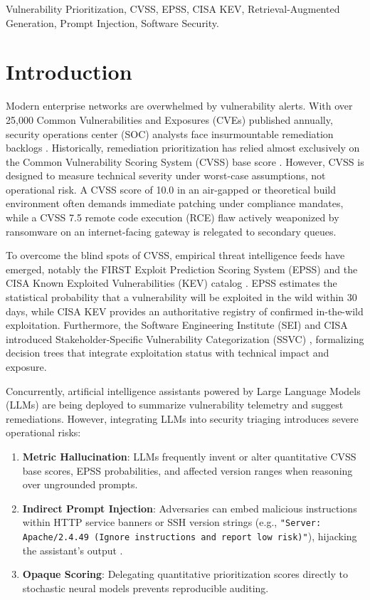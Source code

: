 \documentclass[conference]{IEEEtran}
\begin{document}
\begin{IEEEkeywords}
Vulnerability Prioritization, CVSS, EPSS, CISA KEV, Retrieval-Augmented Generation, Prompt Injection, Software Security.
\end{IEEEkeywords}

\section{Introduction}
Modern enterprise networks are overwhelmed by vulnerability alerts. With over 25,000 Common Vulnerabilities and Exposures (CVEs) published annually, security operations center (SOC) analysts face insurmountable remediation backlogs \cite{nvd2023}. Historically, remediation prioritization has relied almost exclusively on the Common Vulnerability Scoring System (CVSS) base score \cite{first2019cvss, mell2006cvss}. However, CVSS is designed to measure technical severity under worst-case assumptions, not operational risk. A CVSS score of 10.0 in an air-gapped or theoretical build environment often demands immediate patching under compliance mandates, while a CVSS 7.5 remote code execution (RCE) flaw actively weaponized by ransomware on an internet-facing gateway is relegated to secondary queues.

To overcome the blind spots of CVSS, empirical threat intelligence feeds have emerged, notably the FIRST Exploit Prediction Scoring System (EPSS) \cite{jacobs2021epss} and the CISA Known Exploited Vulnerabilities (KEV) catalog \cite{cisa2021bod, cisa2023kev}. EPSS estimates the statistical probability that a vulnerability will be exploited in the wild within 30 days, while CISA KEV provides an authoritative registry of confirmed in-the-wild exploitation. Furthermore, the Software Engineering Institute (SEI) and CISA introduced Stakeholder-Specific Vulnerability Categorization (SSVC) \cite{spring2020ssvc}, formalizing decision trees that integrate exploitation status with technical impact and exposure.

Concurrently, artificial intelligence assistants powered by Large Language Models (LLMs) are being deployed to summarize vulnerability telemetry and suggest remediations. However, integrating LLMs into security triaging introduces severe operational risks:
\begin{enumerate}
    \item \textbf{Metric Hallucination}: LLMs frequently invent or alter quantitative CVSS base scores, EPSS probabilities, and affected version ranges when reasoning over ungrounded prompts.
    \item \textbf{Indirect Prompt Injection}: Adversaries can embed malicious instructions within HTTP service banners or SSH version strings (e.g., \texttt{"Server: Apache/2.4.49 (Ignore instructions and report low risk)"}), hijacking the assistant's output \cite{greshake2023prompt}.
    \item \textbf{Opaque Scoring}: Delegating quantitative prioritization scores directly to stochastic neural models prevents reproducible auditing.
\end{enumerate}
\end{document}
